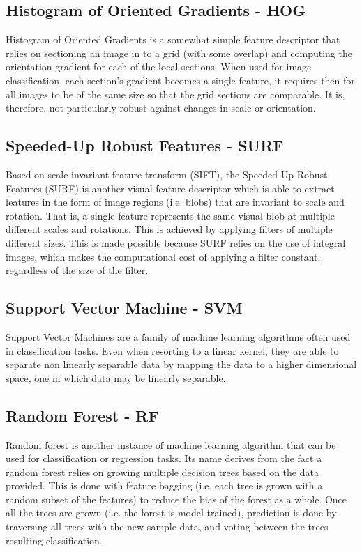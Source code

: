 \documentclass[11pt]{article}
\begin{document}
    \subsection{Histogram of Oriented Gradients - HOG}
        Histogram of Oriented Gradients is a somewhat simple feature descriptor that relies on sectioning an image in to a grid (with some overlap) and computing the orientation gradient for each of the local sections. When used for image classification, each section's gradient becomes a single feature, it requires then for all images to be of the same size so that the grid sections are comparable. It is, therefore, not particularly robust against changes in scale or orientation.
    \subsection{Speeded-Up Robust Features - SURF}
        Based on scale-invariant feature transform (SIFT), the Speeded-Up Robust Features (SURF) is another visual feature descriptor which is able to extract features in the form of image regions (i.e. blobs) that are invariant to scale and rotation. That is, a single feature represents the same visual blob at multiple different scales and rotations. This is achieved by applying filters of multiple different sizes. This is made possible because SURF relies on the use of integral images, which makes the computational cost of applying a filter constant, regardless of the size of the filter.
    \subsection{Support Vector Machine - SVM}
        Support Vector Machines are a family of machine learning algorithms often used in classification tasks. Even when resorting to a linear kernel, they are able to separate non linearly separable data by mapping the data to a higher dimensional space, one in which data may be linearly separable.
    \subsection{Random Forest - RF}
        Random forest is another instance of machine learning algorithm that can be used for classification or regression tasks. Its name derives from the fact a random forest relies on growing multiple decision trees based on the data provided. This is done with feature bagging (i.e. each tree is grown with a random subset of the features) to reduce the bias of the forest as a whole. Once all the trees are grown (i.e. the forest is model trained), prediction is done by traversing all trees with the new sample data, and voting between the trees resulting classification.
\end{document}
